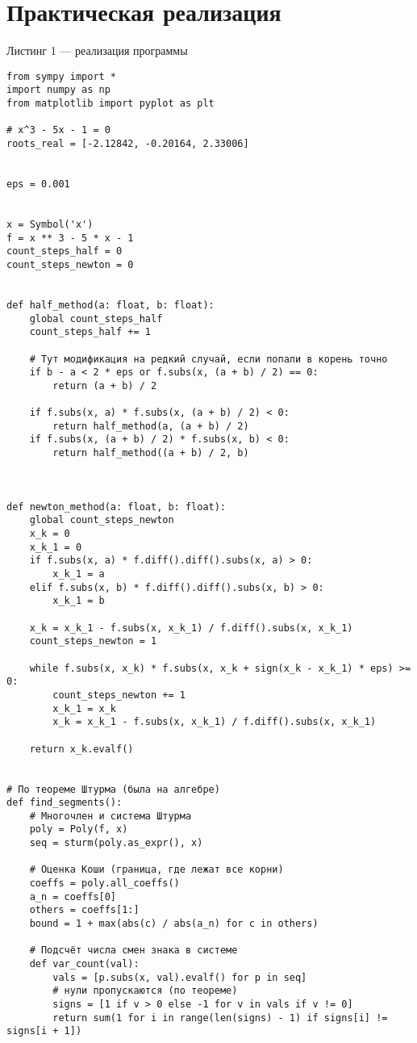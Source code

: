 \documentclass[a4paper, 14pt]{extarticle}
\begin{document}
\section{Практическая реализация}
Листинг 1 — реализация программы
\begin{verbatim}
from sympy import *
import numpy as np
from matplotlib import pyplot as plt

# x^3 - 5x - 1 = 0
roots_real = [-2.12842, -0.20164, 2.33006]


eps = 0.001


x = Symbol('x')
f = x ** 3 - 5 * x - 1
count_steps_half = 0
count_steps_newton = 0


def half_method(a: float, b: float):
	global count_steps_half
	count_steps_half += 1
	
	# Тут модификация на редкий случай, если попали в корень точно
	if b - a < 2 * eps or f.subs(x, (a + b) / 2) == 0:
		return (a + b) / 2
	
	if f.subs(x, a) * f.subs(x, (a + b) / 2) < 0:
		return half_method(a, (a + b) / 2)
	if f.subs(x, (a + b) / 2) * f.subs(x, b) < 0:
		return half_method((a + b) / 2, b)



def newton_method(a: float, b: float):
	global count_steps_newton
	x_k = 0
	x_k_1 = 0
	if f.subs(x, a) * f.diff().diff().subs(x, a) > 0:
		x_k_1 = a
	elif f.subs(x, b) * f.diff().diff().subs(x, b) > 0:
		x_k_1 = b
	
	x_k = x_k_1 - f.subs(x, x_k_1) / f.diff().subs(x, x_k_1)
	count_steps_newton = 1
	
	while f.subs(x, x_k) * f.subs(x, x_k + sign(x_k - x_k_1) * eps) >= 0:
		count_steps_newton += 1
		x_k_1 = x_k
		x_k = x_k_1 - f.subs(x, x_k_1) / f.diff().subs(x, x_k_1)
	
	return x_k.evalf()


# По теореме Штурма (была на алгебре)
def find_segments():
	# Многочлен и система Штурма
	poly = Poly(f, x)
	seq = sturm(poly.as_expr(), x)
	
	# Оценка Коши (граница, где лежат все корни)
	coeffs = poly.all_coeffs()
	a_n = coeffs[0]
	others = coeffs[1:]
	bound = 1 + max(abs(c) / abs(a_n) for c in others)
	
	# Подсчёт числа смен знака в системе
	def var_count(val):
		vals = [p.subs(x, val).evalf() for p in seq]
		# нули пропускаются (по теореме)
		signs = [1 if v > 0 else -1 for v in vals if v != 0]
		return sum(1 for i in range(len(signs) - 1) if signs[i] != signs[i + 1])
		

\end{verbatim}
\end{document}

